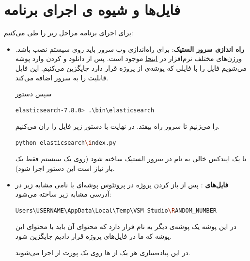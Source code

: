 \section{فایل‌ها و شیوه ‌ی اجرای برنامه}
برای اجرای برنامه مراحل زیر را طی می‌کنیم:
\begin{itemize}
	\item 
	\textbf{راه اندازی سرور الستیک}:
	برای راه‌اندازی وب سرور باید  
	روی سیستم نصب باشد. ورژن‌های مختلف نرم‌افزار در 
	\href{https://www.elastic.co/downloads/elasticsearch}{اینجا}
	موجود است. پس از دانلود و 
	کردن وارد پوشه می‌شویم فایل 
	را با فایلی که پوشه‌ی 
	از پروژه قرار دارد جایگزین می‌کنیم. این فایل قابلیت 
	را به سرور اضافه می‌کند. 
	
	 سپس دستور 
\begin{latin}
\begin{lstlisting}[language=bash]
elasticsearch-7.8.0> .\bin\elasticsearch
\end{lstlisting}
\end{latin}
را می‌زنیم تا سرور راه بیفتد. در نهایت با دستور زیر فایل 
را ران می‌کنیم.  
\begin{latin}
\begin{lstlisting}[language=bash]
python elasticsearch\index.py
\end{lstlisting}
\end{latin}
تا یک ایندکس خالی به نام 
در سرور الستیک ساخته شود (روی یک سیستم فقط یک بار نیاز است این دستور اجرا شود). 
	\item 
	\textbf{فایل‌های }:
	پس از باز کردن پروژه در پروتئوس پوشه‌ای با نامی مشابه زیر در آدرسی مشابه زیر ساخته می‌شود:
\begin{latin}
\begin{lstlisting}[language=bash]
Users\USERNAME\AppData\Local\Temp\VSM Studio\RANDOM_NUMBER
\end{lstlisting}
\end{latin}	
در این پوشه یک پوشه‌ی دیگر به نام 
قرار دارد که محتوای آن باید با محتوای این پوشه که ما در فایل‌های پروژه قرار دادیم جایگزین شود. 

در این پیاده‌سازی هر یک از 
ها روی یک پورت از 
اجرا می‌شوند. 
		

\end{itemize}
